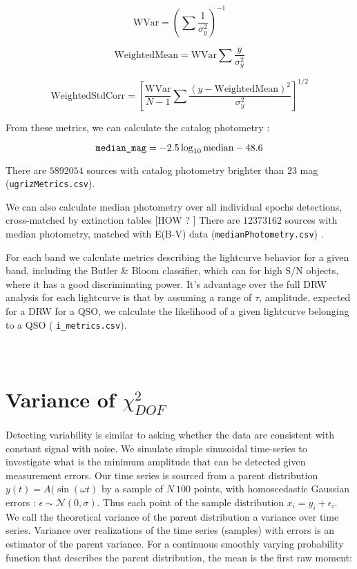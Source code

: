 \documentclass[fleqn,usenatbib]{mnras}  %
\begin{document}
\begin{equation}
\mbox{WVar} = \left( \sum{\frac{1}{\sigma_{y}^{2}}} \right) ^{-1}
\end{equation} 

\begin{equation}
\mbox{WeightedMean} = \mbox{WVar} \sum{\frac{y}{\sigma_{y}^{2}}}
\end{equation}

\begin{equation}
\mbox{WeightedStdCorr} =  \left[ \frac{ \mbox{WVar}  }{N-1} \sum{\frac{(y-\mbox{WeightedMean})^{2}}{\sigma_{y}^{2}}} \right] ^{1/2}
\end{equation}



From these metrics, we can calculate the catalog photometry  :

\begin{equation}
\verb|median_mag| = -2.5 \log_{10}\mbox{median} - 48.6
\end{equation}

There are  $5892054$ sources with catalog photometry brighter than $23$ mag  (\verb|ugrizMetrics.csv|). 

We can also calculate median photometry over all individual epochs  detections, cross-matched by extinction tables [HOW ? ]  There are $12373162$ sources with median photometry, matched with E(B-V) data (\verb|medianPhotometry.csv|) . 

For each band we calculate metrics describing the lightcurve behavior for a given band, including the Butler \& Bloom classifier, which can  for high S/N objects, where it has a good discriminating power. It's advantage over the full DRW analysis for each lightcurve is that by assuming a range of $\tau$, amplitude, expected for a DRW for a QSO, we calculate the likelihood of a given lightcurve belonging to a QSO ( \verb|i_metrics.csv|). 

\section{\\ Variance of $\chi^{2}_{DOF}$ }
\label{App:AppendixD}

Detecting variability is similar to asking whether the data are consistent with constant signal with noise. We simulate simple sinusoidal time-series to investigate what is the minimum amplitude that can be detected given measurement errors. Our time series is sourced from a parent distribution $y(t) = A(\sin(\omega t)$ by a sample of $N~100$ points, with homoscedastic Gaussian errors :  $\epsilon \sim \mathcal{N}(0,\sigma)$.  Thus each point of the sample distribution $x_{i} = y_{i} + \epsilon_{i}$. We call the theoretical variance of the parent distribution a variance over time series. Variance over realizations of the time series (samples) with errors is an estimator of the parent variance.  For a continuous smoothly varying probability function that describes the parent distribution, the mean is the first raw moment:
\end{document}
